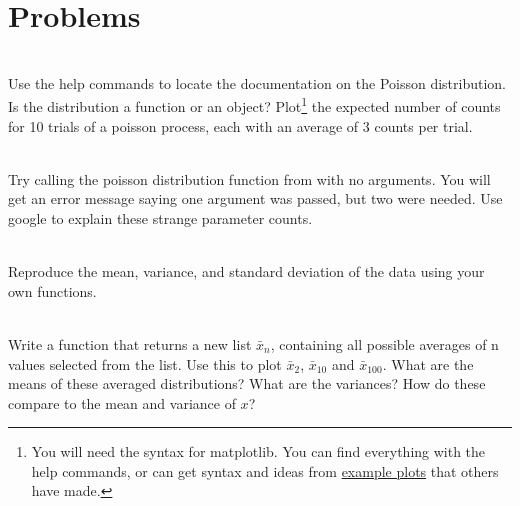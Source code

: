 \documentclass[justified, nobib]{tufte-handout}
\newcommand{\matplotlibGalleryLink}{http://matplotlib.org/gallery.html}
\newcommand{\matplotlibGalleryNote}{\footnote{You will need the syntax for
      matplotlib. You can find everything with the help commands, or can get
      syntax and ideas from \href{\matplotlibGalleryLink}{example plots} that
      others have made.}}
\begin{document}
\pagebreak

\section*{Problems}
\vspace{-0.5cm}

 \\
  Use the help commands to locate the  documentation
  on the Poisson distribution.
  Is the distribution a function or an object?
  Plot\matplotlibGalleryNote{} the expected number of counts for 10 trials of
  a poisson process, each with an average of 3 counts per trial.

 \\
  Try calling the poisson distribution function from
   with no arguments.
  You will get an error message saying one argument was passed, but two were
  needed.
  Use google to explain these strange parameter counts.

 \\
  Reproduce the mean, variance, and standard deviation of the data using your
  own functions.




 \\
  Write a function  that returns a new list
  $\bar{x}_n$, containing all possible averages of n values selected from the
  list.
  Use this to plot $\bar{x}_2$, $\bar{x}_{10}$ and $\bar{x}_{100}$.
  What are the means of these averaged distributions?
  What are the variances?
  How do these compare to the mean and variance of $x$?
\end{document}
